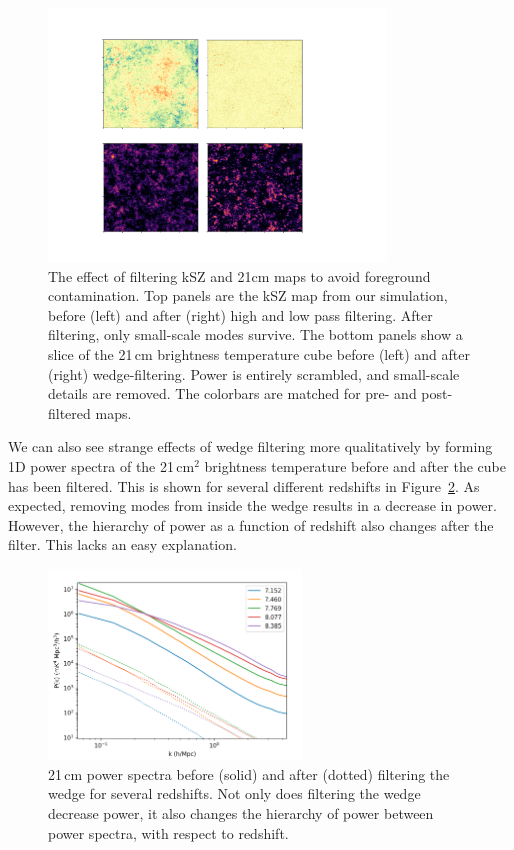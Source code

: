 \begin{figure}
\centering
\includegraphics[width=0.8\textwidth]{chapters/ksz_21cm/figures/filter_compare.pdf}
\caption[The effect of filtering kSZ and 21cm maps to avoid foreground contamination.]{The effect of filtering kSZ and 21cm maps to avoid foreground contamination. Top panels are the kSZ map from our simulation, before (left) and after (right) high and low pass filtering. After filtering, only small-scale modes survive. The bottom panels show a slice of the 21\,cm brightness temperature cube before (left) and after (right) wedge-filtering. Power is entirely scrambled, and small-scale details are removed. The colorbars are matched for pre- and post- filtered maps.}
\label{fig:effect_of_filtering_panels}
\end{figure}

We can also see strange effects of wedge filtering more qualitatively by forming 1D power spectra of the 21\,cm$^2$ brightness temperature before and after the cube has been filtered. This is shown for several different redshifts in Figure~\ref{fig:effect_of_filtering_21squared}. As expected, removing modes from inside the wedge results in a decrease in power. However, the hierarchy of power as a function of redshift also changes after the filter. This lacks an easy explanation.

\begin{figure}
\centering
\includegraphics[width=0.6\textwidth]{chapters/ksz_21cm/figures/unfilt_filt_pspec21.png}
\caption[21\,cm$^2$ power spectra before and after filtering the wedge for several redshifts.]{21\,cm power spectra before (solid) and after (dotted) filtering the wedge for several redshifts. Not only does filtering the wedge decrease power, it also changes the hierarchy of power between power spectra, with respect to redshift.}
\label{fig:effect_of_filtering_21squared}
\end{figure} 

